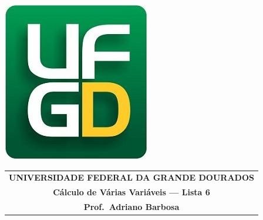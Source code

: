 \documentclass[a4paper,5pt]{amsbook}
\begin{document}
\thispagestyle{empty}
\pagestyle{empty}
\begin{minipage}[h]{0.14\textwidth}
	\includegraphics[scale=0.24]{../../ufgd.png}
\end{minipage}
\begin{minipage}[h]{\textwidth}
\begin{tabular}{c}
{{\bf UNIVERSIDADE FEDERAL DA GRANDE DOURADOS}}\\
{{\bf C\'alculo de V\'arias Vari\'aveis --- Lista 6}}\\
{{\bf Prof.\ Adriano Barbosa}}\\
\end{tabular}
\vspace{-0.45cm}
%
\end{minipage}

\end{document}

